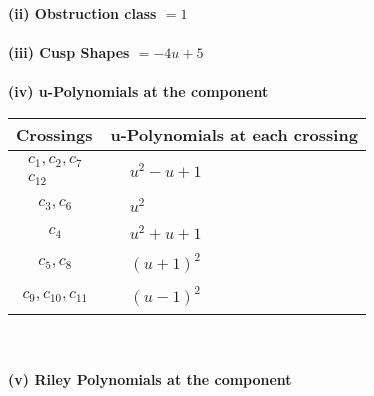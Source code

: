 \documentclass[1p]{elsarticle_modified}
\theoremstyle{definition}
\begin{document}
\flushleft \textbf{(ii) Obstruction class $= 1$}\\~\\
\flushleft \textbf{(iii) Cusp Shapes $= -4 u+5$}\\~\\
\newpage\renewcommand{\arraystretch}{1}
\flushleft \textbf{(iv) u-Polynomials at the component}\newline \\
\begin{tabular}{m{50pt}|m{274pt}}
Crossings & \hspace{64pt}u-Polynomials at each crossing \\
\hline $$\begin{aligned}c_{1},c_{2},c_{7}\\c_{12}\end{aligned}$$&$\begin{aligned}
&u^2- u+1
\end{aligned}$\\
\hline $$\begin{aligned}c_{3},c_{6}\end{aligned}$$&$\begin{aligned}
&u^2
\end{aligned}$\\
\hline $$\begin{aligned}c_{4}\end{aligned}$$&$\begin{aligned}
&u^2+u+1
\end{aligned}$\\
\hline $$\begin{aligned}c_{5},c_{8}\end{aligned}$$&$\begin{aligned}
&(u+1)^2
\end{aligned}$\\
\hline $$\begin{aligned}c_{9},c_{10},c_{11}\end{aligned}$$&$\begin{aligned}
&(u-1)^2
\end{aligned}$\\
\hline
\end{tabular}\\~\\
\newpage\renewcommand{\arraystretch}{1}
\flushleft \textbf{(v) Riley Polynomials at the component}\newline \\
\end{document}
